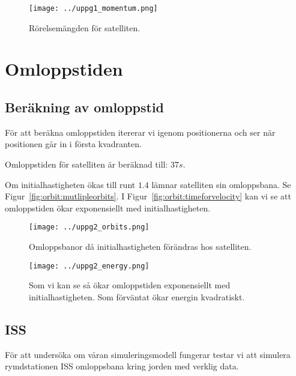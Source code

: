 \documentclass[a4]{article}
\begin{document}
\begin{figure}
\begin{center}
	\texttt{[image: ../uppg1\_momentum.png]}
\end{center}
\caption{Rörelsemängden för satelliten.}
\label{fig:satellite:linearmomentum}
\end{figure}


\section{Omloppstiden}
	\subsection{Beräkning av omloppstid}
För att beräkna omloppstiden itererar vi igenom positionerna och ser när
positionen går in i första kvadranten.

Omloppstiden för satelliten är beräknad till: $37s$.

Om initialhastigheten ökas till runt $1.4$ lämnar satelliten sin omloppsbana.
Se Figur~\vref{fig:orbit:mutlipleorbits}.
I Figur~\vref{fig:orbit:timeforvelocity} kan vi se att omloppstiden ökar exponensiellt
med initialhastigheten.

\begin{figure}
\begin{center}
	\texttt{[image: ../uppg2\_orbits.png]}
\end{center}
\caption{
Omloppsbanor då initialhastigheten förändras hos satelliten.
}
\label{fig:orbit:mutlipleorbits}
\end{figure}

\begin{figure}
\begin{center}
	\texttt{[image: ../uppg2\_energy.png]}
\end{center}
\caption{
Som vi kan se så ökar omloppstiden exponensiellt med initialhastigheten.
Som förväntat ökar energin kvadratiskt.
}
\label{fig:orbit:timeforvelocity}
\end{figure}

	\subsection{ISS}
För att undersöka om våran simuleringsmodell fungerar testar vi att simulera
rymdstationen ISS omloppsbana kring jorden med verklig data.
\end{document}
